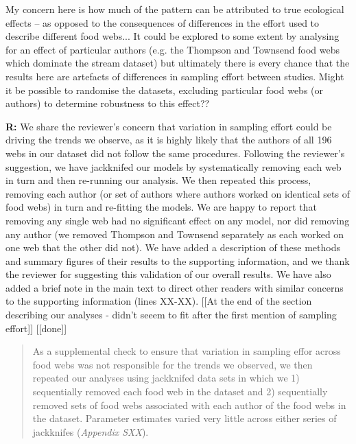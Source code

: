 \documentclass[12pt]{letter}
\newenvironment{refquote}{\bigskip \begin{it}}{\end{it}\smallskip}
\begin{document}
  \begin{refquote}

    My concern here is how much of the pattern can be attributed to true
    ecological effects – as opposed to the consequences of differences in the
    effort used to describe different food webs... It could be explored to some extent by
    analysing for an effect of particular authors (e.g. the Thompson and
    Townsend food webs which dominate the stream dataset) but ultimately there
    is every chance that the results here are artefacts of differences in
    sampling effort between studies. Might it be possible to randomise the
    datasets, excluding particular food webs (or authors) to determine
    robustness to this effect?? 

  \end{refquote}


  \textbf{R:} We share the reviewer's concern that variation in sampling
  effort could be driving the trends we observe, as it is highly likely that
  the authors of all 196 webs in our dataset did not follow the same procedures.
  Following the reviewer's suggestion, we have jackknifed our models by systematically
  removing each web in turn and then re-running our analysis. We then repeated this
  process, removing each author (or set of authors where authors worked on identical sets
  of food webs) in turn and re-fitting the models. We are happy to report that removing
  any single web had no significant effect on any model, nor did removing any author
  (we removed Thompson and Townsend separately as each worked on one web that the other
  did not). We have added a description of these methods and summary figures of their results
  to the supporting information, and we thank the reviewer for suggesting this validation
  of our overall results. We have also added a brief note in the main text to direct other
  readers with similar concerns to the supporting information (lines XX-XX). [[At the end of the 
  section describing our analyses - didn't seeem to fit after the first mention of sampling effort]]
  [[done]]


  \begin{quotation}

    As a supplemental check to ensure that variation in sampling effor across
    food webs was not responsible for the trends we observed, we then repeated
    our analyses using jackknifed data sets in which we 1) sequentially removed
    each food web in the dataset and 2) sequentially removed sets of food webs 
    associated with each author of the food webs in the dataset. Parameter 
    estimates varied very little across either series of jackknifes (\emph{Appendix SXX}).

  \end{quotation}
\end{document}
